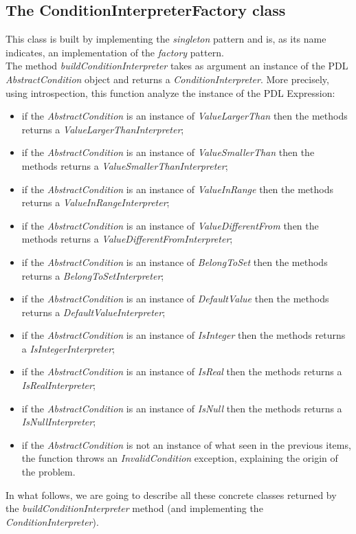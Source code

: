 \documentclass[a4paper,11pt] {ivoa}
\begin{document}
\subsection{The ConditionInterpreterFactory class}
This class is built by implementing the {\it singleton} pattern and is, as its name indicates, an implementation of the {\it factory} pattern.\\
The method {\it buildConditionInterpreter} takes as argument an instance of the PDL {\it AbstractCondition} object and returns a {\it ConditionInterpreter}.
More precisely, using introspection, this function analyze the instance of the PDL Expression:
\begin{itemize}
\item if the {\it AbstractCondition} is an instance of {\it ValueLargerThan} then the methods returns a {\it ValueLargerThanInterpreter};
\item if the {\it AbstractCondition} is an instance of {\it ValueSmallerThan} then the methods returns a {\it ValueSmallerThanInterpreter};
\item if the {\it AbstractCondition} is an instance of {\it ValueInRange} then the methods returns a {\it ValueInRangeInterpreter};
\item if the {\it AbstractCondition} is an instance of {\it ValueDifferentFrom} then the methods returns a {\it ValueDifferentFromInterpreter};
\item if the {\it AbstractCondition} is an instance of {\it BelongToSet} then the methods returns a {\it BelongToSetInterpreter};
\item if the {\it AbstractCondition} is an instance of {\it DefaultValue} then the methods returns a {\it DefaultValueInterpreter};
\item if the {\it AbstractCondition} is an instance of {\it IsInteger} then the methods returns a {\it IsIntegerInterpreter};
\item if the {\it AbstractCondition} is an instance of {\it IsReal} then the methods returns a {\it IsRealInterpreter};
\item if the {\it AbstractCondition} is an instance of {\it IsNull} then the methods returns a {\it IsNullInterpreter};
\item if the {\it AbstractCondition} is not an instance of what seen in the previous items, the function throws an {\it InvalidCondition} exception, explaining the origin of the problem.
\end{itemize} 
In what follows, we are going to describe all these concrete classes returned by the  {\it buildConditionInterpreter} method (and implementing the {\it ConditionInterpreter}).
\end{document}
